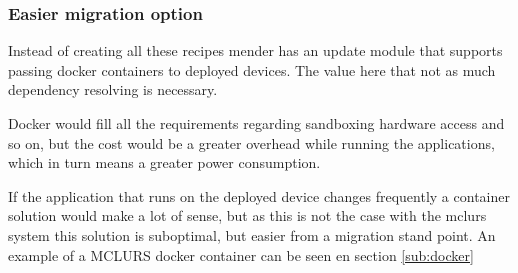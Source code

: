 \documentclass[../../main.tex]{subfiles}
\begin{document}
\subsubsection{Easier migration option}%
\label{ssub:easier_migration_option}

Instead of creating all these recipes mender has an update module that supports 
passing docker containers to deployed devices.
The value here that not as much dependency resolving is necessary.

Docker would fill all the requirements regarding sandboxing hardware access and so on,
but the cost would be a greater overhead while running the applications, which in turn
means a greater power consumption.

If the application that runs on the deployed device changes frequently a container solution
would make a lot of sense, but as this is not the case with the mclurs system this solution
is suboptimal, but easier from a migration stand point.
An example of a MCLURS docker container can be seen en section \ref{sub:docker}
\end{document}
